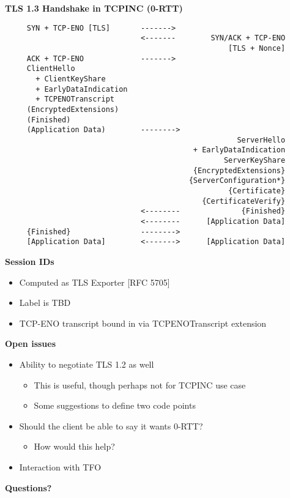 \documentclass[helvetica]{seminar}
\newcommand{\heading}[1]{%
  \begin{center} 
    \large\bf 
    #1 
  \end{center} 
  \vspace{.4 in}}
\begin{document}
\begin{slide}
\heading{TLS 1.3 Handshake in TCPINC (0-RTT)}

\vspace{-5ex}
\begin{scriptsize}
\begin{verbatim}
     SYN + TCP-ENO [TLS]       ------->
                               <-------        SYN/ACK + TCP-ENO
                                                   [TLS + Nonce]
     ACK + TCP-ENO             ------->
     ClientHello
       + ClientKeyShare
       + EarlyDataIndication
       + TCPENOTranscript
     (EncryptedExtensions)
     (Finished)
     (Application Data)        -------->
                                                     ServerHello
                                           + EarlyDataIndication
                                                  ServerKeyShare
                                           {EncryptedExtensions}
                                          {ServerConfiguration*}
                                                   {Certificate}
                                             {CertificateVerify}
                               <--------              {Finished}
                               <--------      [Application Data]
     {Finished}                -------->
     [Application Data]        <------->      [Application Data]
\end{verbatim}
\end{scriptsize}
\end{slide}


\begin{slide}
\heading{Session IDs}

\begin{itemize}
\item Computed as TLS Exporter [RFC 5705]
\item Label is TBD
\item TCP-ENO transcript bound in via TCPENOTranscript extension
\end{itemize}
\end{slide}


\begin{slide}
\heading{Open issues}

\begin{itemize}
\item Ability to negotiate TLS 1.2 as well
  \begin{itemize}
  \item This is useful, though perhaps not for TCPINC use case
  \item Some suggestions to define two code points
  \end{itemize}

\item Should the client be able to say it wants 0-RTT?
  \begin{itemize}
  \item How would this help?
  \end{itemize}

\item Interaction with TFO
\end{itemize}
\end{slide}

\begin{slide}
\heading{Questions?}

\end{slide}
\end{document}
